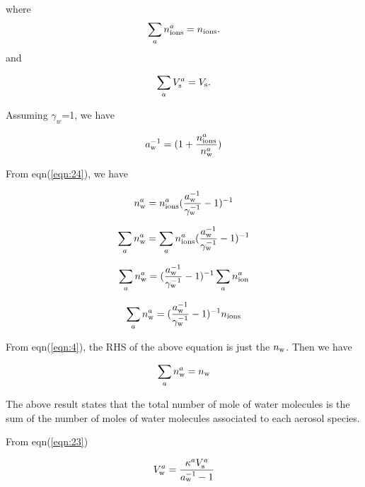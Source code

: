 \documentclass[12pt]{article}
\begin{document}
where
\begin{equation}\label{eqn:25}
\sum_{a} n_{\rm ions}^{a}=n_{\rm ions}.
\end{equation}
 and 
 
\begin{equation}\label{eqn:25}
\sum_{a} V_{\rm s}^{a}=V_{\rm s}.
\end{equation}

 
Assuming $\gamma_{w}$=1, we have 

\begin{equation}\label{eqn:26}
a_{\rm w}^{-1}=(1+\frac{n_{\rm ions}^{a}}{n_{\rm w}^{a}})
\end{equation}

From eqn(\ref{eqn:24}), we have

\begin{equation}\label{eqn:27}
n_{\rm w}^{a}=n_{\rm ions}^{a}(\frac{a_{\rm w}^{-1}}{\gamma_{\rm w}^{-1}}-1)^{-1}
\end{equation}

\begin{equation}
\sum_{a} n_{\rm w}^{a}=\sum_{a}n_{\rm ions}^{a}(\frac{a_{\rm w}^{-1}}{\gamma_{\rm w}^{-1}}-1)^{-1}
\end{equation}

\begin{equation}
\sum_{a} n_{\rm w}^{a}=(\frac{a_{\rm w}^{-1}}{\gamma_{\rm w}^{-1}}-1)^{-1}\sum_{a}n_{\rm ion}^{a}
\end{equation}

\begin{equation}
\sum_{a} n_{\rm w}^{a}=(\frac{a_{\rm w}^{-1}}{\gamma_{\rm w}^{-1}}-1)^{-1} n_{\rm ions}
\end{equation}

From eqn(\ref{eqn:4}), the RHS of the above equation is just the $n_{\rm w}$. Then we have 

\begin{equation}
\sum_{a} n_{\rm w}^{a}=n_{\rm w}
\end{equation}

The above result states that the total number of mole of water molecules is the sum of the number of moles of water molecules associated to each aerosol species. 


From eqn(\ref{eqn:23})

\begin{equation}
V_{\rm w}^{a}=\frac{\kappa^{a} V_{\rm s}^{a}}{a_{\rm w}^{-1}-1}
\end{equation}
\end{document}
